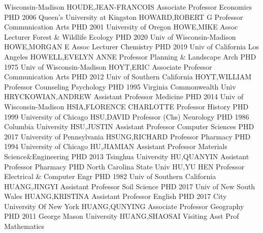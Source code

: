 \documentclass[
]{article}
\begin{document}
Wisconsin-Madison \textbar{}  \textbar HOUDE,JEAN-FRANCOIS
\textbar Associate Professor \textbar Economics \textbar PHD 2006
Queen's University at Kingston \textbar{} 
\textbar HOWARD,ROBERT G \textbar Professor \textbar Communication Arts
\textbar PHD 2001 University of Oregon \textbar{} 
\textbar HOWE,MIKE \textbar Assoc Lecturer \textbar Forest \& Wildlife
Ecology \textbar PHD 2020 Univ of Wisconsin-Madison \textbar{}
 \textbar HOWE,MORGAN E \textbar Assoc Lecturer
\textbar Chemistry \textbar PHD 2019 Univ of California Los Angeles
\textbar{}  \textbar HOWELL,EVELYN ANNE \textbar Professor
\textbar Planning \& Landscape Arch \textbar PHD 1975 Univ of
Wisconsin-Madison \textbar{}  \textbar HOYT,ERIC
\textbar Associate Professor \textbar Communication Arts \textbar PHD
2012 Univ of Southern California \textbar{} 
\textbar HOYT,WILLIAM \textbar Professor \textbar Counseling Psychology
\textbar PHD 1995 Virginia Commonwealth Univ \textbar{} 
\textbar HRYCKOWIAN,ANDREW \textbar Assistant Professor
\textbar Medicine \textbar PHD 2014 Univ of Wisconsin-Madison \textbar{}
 \textbar HSIA,FLORENCE CHARLOTTE \textbar Professor
\textbar History \textbar PHD 1999 University of Chicago \textbar{}
 \textbar HSU,DAVID \textbar Professor (Chs)
\textbar Neurology \textbar PHD 1986 Columbia University \textbar{}
 \textbar HSU,JUSTIN \textbar Assistant Professor
\textbar Computer Sciences \textbar PHD 2017 University of Pennsylvania
\textbar{}  \textbar HSUNG,RICHARD \textbar Professor
\textbar Pharmacy \textbar PHD 1994 University of Chicago \textbar{}
 \textbar HU,JIAMIAN \textbar Assistant Professor
\textbar Materials Science\&Engineering \textbar PHD 2013 Tsinghua
University \textbar{}  \textbar HU,QUANYIN
\textbar Assistant Professor \textbar Pharmacy \textbar PHD North
Carolina State Univ \textbar{}  \textbar HU,YU HEN
\textbar Professor \textbar Electrical \& Computer Engr \textbar PHD
1982 Univ of Southern California \textbar{} 
\textbar HUANG,JINGYI \textbar Assistant Professor \textbar Soil Science
\textbar PHD 2017 Univ of New South Wales \textbar{} 
\textbar HUANG,KRISTINA \textbar Assistant Professor \textbar English
\textbar PHD 2017 City University Of New York \textbar{} 
\textbar HUANG,QUNYING \textbar Associate Professor \textbar Geography
\textbar PHD 2011 George Mason University \textbar{} 
\textbar HUANG,SHAOSAI \textbar Visiting Asst Prof \textbar Mathematics
\end{document}
